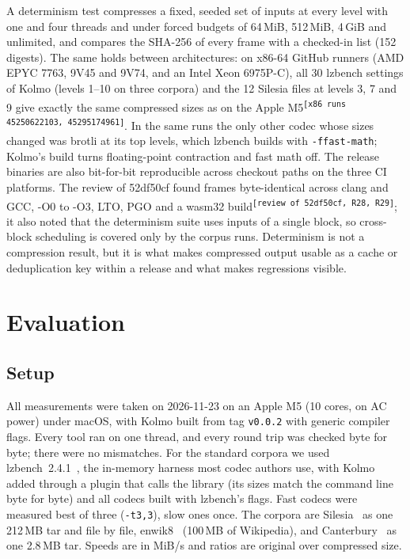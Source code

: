 \documentclass[conference]{IEEEtran}
\newcommand{\src}[1]{\textsuperscript{\tiny\color{gray}\texttt{[#1]}}}
\newcommand{\src}[1]{}
\begin{document}
A determinism test compresses a fixed, seeded set of inputs at every level with one and four threads and under forced
budgets of 64\,MiB, 512\,MiB, 4\,GiB and unlimited, and compares the SHA-256 of every frame with a checked-in list
(152 digests). The same holds between architectures: on x86-64 GitHub runners (AMD EPYC 7763, 9V45 and 9V74, and
an Intel Xeon 6975P-C), all 30 lzbench settings of Kolmo (levels 1--10 on three corpora) and the 12 Silesia files at
levels 3, 7 and 9 give exactly the same compressed sizes as on the Apple M5\src{x86 runs 45250622103, 45295174961}.
In the same runs the only other codec whose sizes changed was brotli at its top levels, which lzbench builds with
\texttt{-ffast-math}; Kolmo's build turns floating-point contraction and fast math off. The release binaries are also bit-for-bit reproducible across checkout paths on the three CI
platforms. The review of 52df50cf found frames byte-identical across clang and GCC, -O0 to -O3, LTO, PGO and a wasm32 build\src{review of 52df50cf, R28, R29}; it also noted that the
determinism suite uses inputs of a single block, so cross-block scheduling is covered only by the corpus runs.
Determinism is not a compression result, but it is what makes compressed output usable as a cache or
deduplication key within a release and what makes regressions visible.

\section{Evaluation}\label{sec:eval}

\subsection{Setup}\label{sec:setup}
All measurements were taken on 2026-11-23 on an Apple M5 (10 cores, on AC power) under macOS, with Kolmo built from
tag \texttt{v0.0.2} with generic compiler flags. Every tool ran on one thread, and every round trip was checked byte
for byte; there were no mismatches. For the standard corpora we used lzbench~2.4.1~\cite{lzbench}, the in-memory
harness most codec authors use, with Kolmo added through a plugin that calls the library (its sizes match the
command line byte for byte) and all codecs built with lzbench's flags. Fast codecs were measured best of three
(\texttt{-t3,3}), slow ones once. The corpora are Silesia~\cite{silesia,silesia_web} as one 212\,MB tar and file by file,
enwik8~\cite{ltcb} (100\,MB of Wikipedia), and Canterbury~\cite{canterbury,canterbury_web} as one 2.8\,MB tar. Speeds are in MiB/s
and ratios are original over compressed size.
\end{document}
